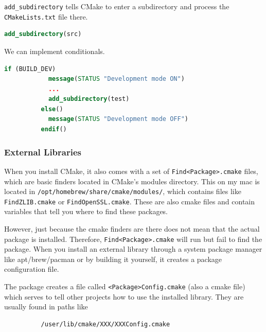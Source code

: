 \documentclass{article}
\newcounter{definition}[section]
\begin{document}
      \begin{definition}[Subdirectories]
        \label{def:subdirectories}
        \texttt{add\_subdirectory} tells CMake to enter a subdirectory and process the \texttt{CMakeLists.txt} file there. 
        \begin{lstlisting}[language=CMake]
          add_subdirectory(src)
        \end{lstlisting}
      \end{definition}

      \begin{definition}[Conditionals]
        \label{def:conditionals}
        We can implement conditionals. 
        \begin{lstlisting}[language=CMake]
          if (BUILD_DEV) 
            message(STATUS "Development mode ON")
            ...
            add_subdirectory(test)
          else()
            message(STATUS "Development mode OFF")
          endif()
        \end{lstlisting}
      \end{definition}
    
    \subsubsection{External Libraries} 

      When you install CMake, it also comes with a set of \texttt{Find<Package>.cmake} files, which are basic finders located in CMake's modules directory. This on my mac is located in \texttt{/opt/homebrew/share/cmake/modules/}, which contains files like \texttt{FindZLIB.cmake} or \texttt{FindOpenSSL.cmake}. These are also cmake files and contain variables that tell you where to find these packages. 

      However, just because the cmake finders are there does not mean that the actual package is installed. Therefore, \texttt{Find<Package>.cmake} will run but fail to find the package. When you install an external library through a system package manager like apt/brew/pacman or by building it yourself, it creates a package configuration file. 

      \begin{definition}
        \label{def:package-config-files}
        The package creates a file called \texttt{<Package>Config.cmake} (also a cmake file) which serves to tell other projects how to use the installed library. They are usually found in paths like 
        \begin{lstlisting}
          /user/lib/cmake/XXX/XXXConfig.cmake
        \end{lstlisting}
      \end{definition}
\end{document}

